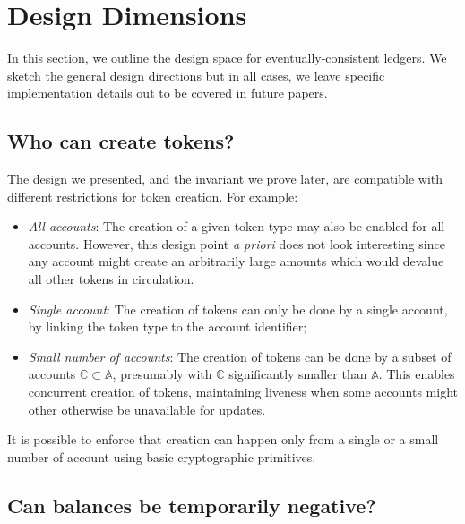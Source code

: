 \documentclass[9pt, oneside]{article}   	%
\begin{document}
\section{Design Dimensions}
\label{sec:design-issues}

In this section, we outline the design space for eventually-consistent ledgers. We sketch the general design directions but in all cases, we leave specific implementation details out to be covered in future papers.

\subsection{Who can create tokens?}

The design we presented, and the invariant we prove later, are compatible with different restrictions for token creation. For example:
\begin{itemize}
	\item \textit{All accounts}: The creation of a given token type may also be enabled for all accounts. However, this design point \textit{a priori} does not look interesting since any account might create an arbitrarily large amounts which would devalue all other tokens in circulation.
	\item \textit{Single account}: The creation of tokens can only be done by a single account, by linking the token type to the account identifier;
	\item \textit{Small number of accounts}: The creation of tokens can be done by a subset of accounts $\mathds{C} \subset \mathds{A}$, presumably with $\mathds{C}$ significantly smaller than $\mathds{A}$. This enables concurrent creation of tokens, maintaining liveness when some accounts might other otherwise be unavailable for updates.
\end{itemize}

It is possible to enforce that creation can happen only from a single or a small number of account using basic cryptographic primitives.


\subsection{Can balances be temporarily negative?}
\label{sec:design-neg-balance-choice}
\end{document}
